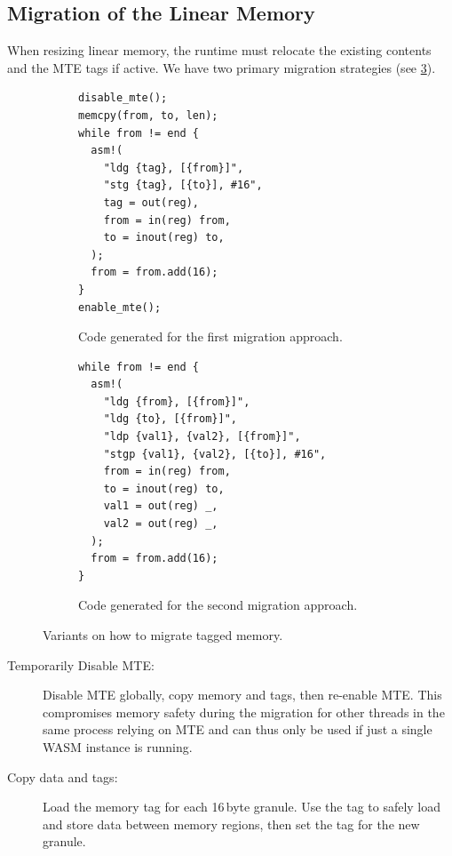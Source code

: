 \subsection{Migration of the Linear Memory}
\label{subsec:migration-of-the-linear-memory}

When resizing linear memory, the runtime must relocate the existing contents and the \ac{MTE} tags if active.
We have two primary migration strategies (see \cref{fig:migrating-memory}).

\begin{figure}[h]
    \centering
    \begin{subfigure}[T]{0.45\textwidth}
        \centering
        \begin{lstlisting}[frame=h,style=customc,label={lst:migrating-memory-disable}]
disable_mte();
memcpy(from, to, len);
while from != end {
  asm!(
    "ldg {tag}, [{from}]",
    "stg {tag}, [{to}], #16",
    tag = out(reg),
    from = in(reg) from,
    to = inout(reg) to,
  );
  from = from.add(16);
}
enable_mte();
        \end{lstlisting}
        \caption{Code generated for the first migration approach.}
        \label{fig:migrating-memory-disable}
    \end{subfigure}
    \hfill
    \begin{subfigure}[T]{0.45\textwidth}
        \centering
        \begin{lstlisting}[frame=h,style=customc,label={lst:migrating-memory-tags}]
while from != end {
  asm!(
    "ldg {from}, [{from}]",
    "ldg {to}, [{from}]",
    "ldp {val1}, {val2}, [{from}]",
    "stgp {val1}, {val2}, [{to}], #16",
    from = in(reg) from,
    to = inout(reg) to,
    val1 = out(reg) _,
    val2 = out(reg) _,
  );
  from = from.add(16);
}
        \end{lstlisting}
        \caption{Code generated for the second migration approach.}
        \label{fig:migrating-memory-tags}
    \end{subfigure}
    \caption{Variants on how to migrate tagged memory.}
    \label{fig:migrating-memory}
\end{figure}

\begin{description}
    \item[Temporarily Disable \ac{MTE}:]
    Disable \ac{MTE} globally, copy memory and tags, then re-enable \ac{MTE}.
    This compromises memory safety during the migration for other threads in the same process relying on \ac{MTE} and can thus only be used if just a single \ac{WASM} instance is running.

    \item[Copy data and tags:]
    Load the memory tag for each 16\,byte granule.
    Use the tag to safely load and store data between memory regions, then set the tag for the new granule.

\end{description}

